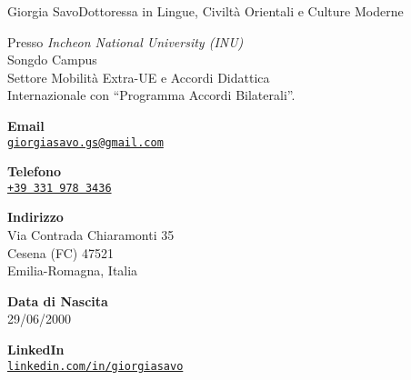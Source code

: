 \documentclass{article}
\begin{document}
\begin{cv}[avatar]{Giorgia Savo}{Dottoressa in Lingue, Civiltà Orientali e Culture Moderne}

\begin{cvevent}[Marzo 2022][Luglio 2022]
    Presso \textit{Incheon National University (INU)}\\ Songdo Campus\\
    Settore Mobilità Extra-UE e Accordi Didattica\\
    Internazionale con “Programma Accordi Bilaterali”.
\end{cvevent}

\cvseparator[2]
\begin{cvevent}[2014]
\end{cvevent}

\cvsidebar %



\begin{cvitem}[Envelope][4]
    \textbf{Email}\\
    \href{mailto:}{\texttt{giorgiasavo.gs@gmail.com}}
\end{cvitem}

\cvseparator[3]
\begin{cvitem}[Phone][5]
    \textbf{Telefono}\\
    \href{tel:+393319783436}{\texttt{+39 331 978 3436}}
\end{cvitem}

\cvseparator[3]
\begin{cvitem}[Home][5]
    \textbf{Indirizzo}\\
    Via Contrada Chiaramonti 35\\ Cesena (FC) 47521\\ Emilia-Romagna, Italia
\end{cvitem}

\cvseparator[3]
\begin{cvitem}[BirthdayCake][5]
    \textbf{Data di Nascita}\\
    29/06/2000
\end{cvitem}

\cvseparator[3]
\begin{cvitem}[Linkedin][5]
	\textbf{LinkedIn}\\
	\href{www.linkedin.com/in/giorgiasavo}{\texttt{linkedin.com/in/giorgiasavo}}
\end{cvitem}



\end{cv}
\end{document}
